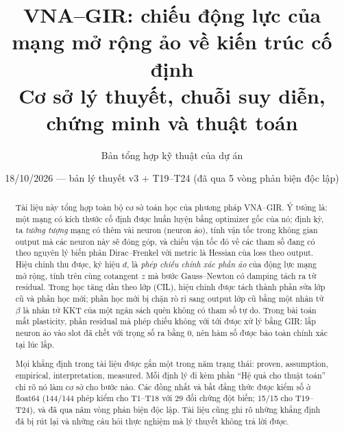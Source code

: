 \documentclass[11pt,a4paper]{article}
\title{\textbf{VNA--GIR: chiếu động lực của mạng mở rộng ảo về kiến trúc cố định}\\[4pt]
\large Cơ sở lý thuyết, chuỗi suy diễn, chứng minh và thuật toán}
\author{Bản tổng hợp kỹ thuật của dự án}
\date{18/10/2026 --- bản lý thuyết v3 + T19--T24 (đã qua 5 vòng phản biện độc lập)}
\theoremstyle{plain}
\theoremstyle{definition}
\theoremstyle{remark}
\newcommand{\st}[1]{\textsf{\small #1}}   %
\begin{document}
\maketitle

\begin{abstract}
Tài liệu này tổng hợp toàn bộ cơ sở toán học của phương pháp VNA--GIR. Ý tưởng là: một mạng có kích thước cố định được huấn luyện bằng optimizer gốc của nó; định kỳ, ta \emph{tưởng tượng} mạng có thêm vài neuron (neuron ảo), tính vận tốc trong không gian output mà các neuron này sẽ đóng góp, và chiếu vận tốc đó về các tham số đang có theo nguyên lý biến phân Dirac--Frenkel với metric là Hessian của loss theo output. Hiệu chỉnh thu được, ký hiệu $d$, là \emph{phép chiếu chính xác phần ảo} của động lực mạng mở rộng, tính trên cùng cotangent $z$ mà bước Gauss--Newton có damping tách ra từ residual. Trong học tăng dần theo lớp (CIL), hiệu chỉnh được tách thành phần sửa lớp cũ và phần học mới; phần học mới bị chặn rò rỉ sang output lớp cũ bằng một nhân tử $\beta$ là nhân tử KKT của một ngân sách quên không có tham số tự do. Trong bài toán mất plasticity, phần residual mà phép chiếu không với tới được xử lý bằng GIR: lắp neuron ảo vào slot đã chết với trọng số ra bằng $0$, nên hàm số được bảo toàn chính xác tại lúc lắp.

Mọi khẳng định trong tài liệu được gắn một trong năm trạng thái: \st{proven}, \st{assumption}, \st{empirical}, \st{interpretation}, \st{measured}. Mỗi định lý đi kèm phần ``Hệ quả cho thuật toán'' chỉ rõ nó làm cơ sở cho bước nào. Các đồng nhất và bất đẳng thức được kiểm số ở float64 (144/144 phép kiểm cho T1--T18 với 29 đối chứng đột biến; 15/15 cho T19--T24), và đã qua năm vòng phản biện độc lập. Tài liệu cũng ghi rõ những khẳng định đã bị rút lại và những câu hỏi thực nghiệm mà lý thuyết không trả lời được.
\end{abstract}

\tableofcontents
\newpage
















\appendix




\end{document}
